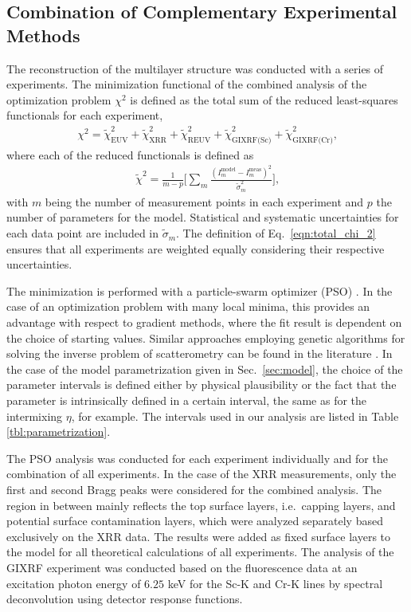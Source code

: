 \subsection{Combination of Complementary Experimental Methods}
The reconstruction of the multilayer structure was conducted with a series of 
experiments. The minimization functional of the combined analysis of the 
optimization problem $\chi^2$ is defined as the total sum of the reduced 
least-squares functionals for each experiment,
\begin{align}
\chi^2 = \tilde{\chi}^2_\text{EUV} +\tilde{\chi}^2_\text{XRR} 
+\tilde{\chi}^2_\text{REUV} + 
\tilde{\chi}^2_\text{GIXRF(Sc)}+\tilde{\chi}^2_\text{GIXRF(Cr)}\text{,} 
\label{eqn:total_chi_2}
\end{align}
where each of the reduced functionals is defined as
\begin{align}
\tilde{\chi}^2 = \frac{1}{m - p} \bigg[\sum\limits_{m} \frac{(I_m^\text{model} 
- I_m^\text{meas})^2}{\tilde{\sigma}_m^2} \bigg] \text{,} 
\label{eqn:reduced_chi_2}
\end{align}
with $m$ being the number of measurement points in each experiment and $p$ the 
number of parameters for the model. Statistical and systematic uncertainties 
for each data point are included in $\tilde{\sigma}_m$. The definition of 
Eq.~\eqref{eqn:total_chi_2} ensures that all experiments are weighted equally 
considering their respective uncertainties.

The minimization is performed with a particle-swarm optimizer (PSO) 
\cite{kennedy_particle_2011}. In the case of an optimization problem with many local 
minima, this provides an advantage with respect to gradient methods, where the 
fit result is dependent on the choice of starting values. Similar approaches 
employing genetic algorithms for solving the inverse problem of scatterometry 
can be found in the literature \cite{del_rio_modeling_2000}. In the case of the model 
parametrization given in Sec.~\ref{sec:model}, the choice of the parameter 
intervals is defined either by physical plausibility or the fact that the 
parameter is intrinsically defined in a certain interval, the same as for the 
intermixing $\eta$, for example. The intervals used in our analysis are listed 
in Table \ref{tbl:parametrization}.

The PSO analysis was conducted for each experiment individually and for the 
combination of all experiments. In the case of the XRR measurements, only the 
first and second Bragg peaks were considered for the combined analysis. The 
region in between mainly reflects the top surface layers, i.e.~capping layers, 
and potential surface contamination layers, which were analyzed separately 
based exclusively on the XRR data. The results were added as fixed surface 
layers to the model for all theoretical calculations of all experiments. The 
analysis of the GIXRF experiment was conducted based on the fluorescence data 
at an excitation photon energy of $6.25$ keV for the Sc-K and Cr-K lines by spectral 
deconvolution using detector response functions.

